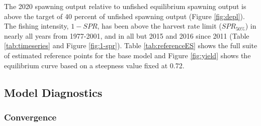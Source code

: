 \documentclass[11pt,
  english,
  a4paper,
]{article}
\begin{document}
\leavevmode\tagmcend\tagstructend\par


The 2020 spawning output relative to unfished equilibrium spawning output is above the target of 40 percent of unfished spawning output (Figure \ref{fig:depl}). The fishing intensity, {\(1-SPR\)\leavevmode\tagmcend\tagstructend}, has been above the harvest rate limit ({\(SPR_{50\%}\)\leavevmode\tagmcend\tagstructend}) in nearly all years from 1977-2001, and in all but 2015 and 2016 since 2011 (Table \ref{tab:timeseries} and Figure \ref{fig:1-spr}). Table \ref{tab:referenceES} shows the full suite of estimated reference points for the base model and Figure \ref{fig:yield} shows the equilibrium curve based on a steepness value fixed at 0.72.

\leavevmode\tagmcend\tagstructend\par


\hypertarget{model-diagnostics}{%
\subsection{Model Diagnostics}\label{model-diagnostics}}

\leavevmode\tagmcend\tagstructend


\hypertarget{convergence}{%
\subsubsection{Convergence}\label{convergence}}

\leavevmode\tagmcend\tagstructend

\end{document}

